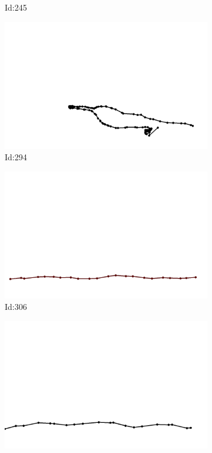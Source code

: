 \documentclass[12pt,twoside]{report}
\begin{document}
\begin{figure}
\begin{subfigure}[b]{0.20\textwidth}
\caption{Id:245}
\end{subfigure}
\begin{subfigure}[b]{0.20\textwidth}
\centering
\includegraphics[width=\textwidth]{../trajectories/294.png}
\caption{Id:294}
\end{subfigure}
\begin{subfigure}[b]{0.20\textwidth}
\centering
\includegraphics[width=\textwidth]{../trajectories/306.png}
\caption{Id:306}
\end{subfigure}
\begin{subfigure}[b]{0.20\textwidth}
\centering
\includegraphics[width=\textwidth]{../trajectories/308.png}

\end{subfigure}
\end{figure}
\end{document}
